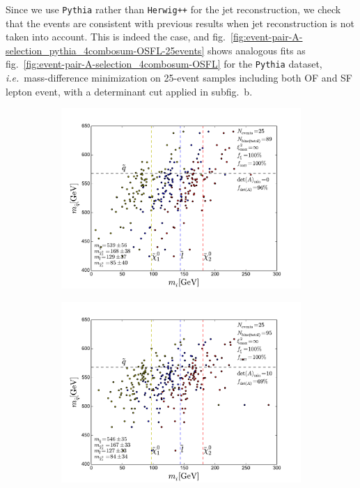 \documentclass[twoside,english]{uiofysmaster}
\begin{document}
Since we use {\tt Pythia} rather than {\tt Herwig++} for the jet reconstruction, we check that the events are consistent with previous results when jet reconstruction is not taken into account. This is indeed the case, and fig.\ \ref{fig:event-pair-A-selection_pythia_4combosum-OSFL-25events} shows analogous fits as fig.\ \ref{fig:event-pair-A-selection_4combosum-OSFL} for the {\tt Pythia} dataset, {\it i.e.}\ mass-difference minimization on 25-event samples including both OF and SF lepton event, with a determinant cut applied in subfig.\ b.
\begin{figure}[hbt]
	\centering
	\begin{subfigure}[b]{0.45\textwidth}
		\includegraphics[width=\textwidth]{figures/improving_combinatorics/pythia_nosmear_25evbins_OSFL_nodetAcut_TMP.pdf} 
		\caption{ }
		\label{fig:event-pair-A-selection_pythia_4combosum-OSFL-25events_a}
	\end{subfigure}
	\begin{subfigure}[b]{0.45\textwidth}
		\includegraphics[width=\textwidth]{figures/improving_combinatorics/pythia_nosmear_25evbins_OSFL_detAcut10_TMP.pdf}

\end{subfigure}
\end{figure}
\end{document}
